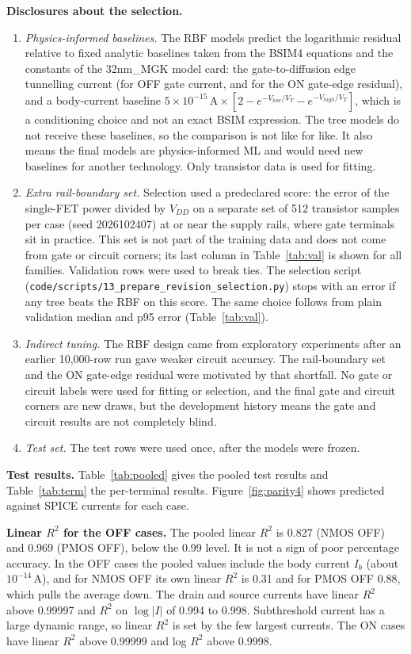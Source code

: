 \textbf{Disclosures about the selection.}
\begin{enumerate}
\item \emph{Physics-informed baselines.} The RBF models predict the logarithmic residual relative to fixed analytic baselines taken from the BSIM4 equations and the constants of the 32nm\_MGK model card: the gate-to-diffusion edge tunnelling current (for OFF gate current, and for the ON gate-edge residual), and a body-current baseline $5\times10^{-15}\,\mathrm{A}\times[2-e^{-V_{low}/V_T}-e^{-V_{high}/V_T}]$, which is a conditioning choice and not an exact BSIM expression. The tree models do not receive these baselines, so the comparison is not like for like. It also means the final models are physics-informed ML and would need new baselines for another technology. Only transistor data is used for fitting.
\item \emph{Extra rail-boundary set.} Selection used a predeclared score: the error of the single-FET power divided by $V_{DD}$ on a separate set of 512 transistor samples per case (seed 2026102407) at or near the supply rails, where gate terminals sit in practice. This set is not part of the training data and does not come from gate or circuit corners; its last column in Table~\ref{tab:val} is shown for all families. Validation rows were used to break ties. The selection script (\texttt{code/scripts/13\_prepare\_revision\_selection.py}) stops with an error if any tree beats the RBF on this score. The same choice follows from plain validation median and p95 error (Table~\ref{tab:val}).
\item \emph{Indirect tuning.} The RBF design came from exploratory experiments after an earlier 10,000-row run gave weaker circuit accuracy. The rail-boundary set and the ON gate-edge residual were motivated by that shortfall. No gate or circuit labels were used for fitting or selection, and the final gate and circuit corners are new draws, but the development history means the gate and circuit results are not completely blind.
\item \emph{Test set.} The test rows were used once, after the models were frozen.
\end{enumerate}

\textbf{Test results.} Table~\ref{tab:pooled} gives the pooled test results and Table~\ref{tab:term} the per-terminal results. Figure~\ref{fig:parity4} shows predicted against SPICE currents for each case.



\textbf{Linear $R^2$ for the OFF cases.} The pooled linear $R^2$ is 0.827 (NMOS OFF) and 0.969 (PMOS OFF), below the 0.99 level. It is not a sign of poor percentage accuracy. In the OFF cases the pooled values include the body current $I_b$ (about $10^{-14}$\,A), and for NMOS OFF its own linear $R^2$ is 0.31 and for PMOS OFF 0.88, which pulls the average down. The drain and source currents have linear $R^2$ above 0.99997 and $R^2$ on $\log|I|$ of 0.994 to 0.998. Subthreshold current has a large dynamic range, so linear $R^2$ is set by the few largest currents. The ON cases have linear $R^2$ above 0.99999 and log $R^2$ above 0.9998.

